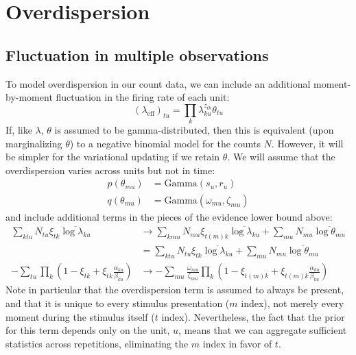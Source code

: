 \documentclass[11pt]{article}
\begin{document}
\section{Overdispersion}
\subsection{Fluctuation in multiple observations}
To model overdispersion in our count data, we can include an additional moment-by-moment fluctuation in the firing rate of each unit:
\begin{equation}
    (\lambda_{\mathrm{eff}})_{tu} = \prod_k \lambda_{ku}^{z_{tk}}\theta_{tu}
\end{equation}
If, like $\lambda$, $\theta$ is assumed to be gamma-distributed, then this is equivalent (upon marginalizing $\theta$) to a negative binomial model for the counts $N$. However, it will be simpler for the variational updating if we retain $\theta$. We will assume that the overdispersion varies across units but not in time:
\begin{align}
    p(\theta_{mu}) &= \mathrm{Gamma}(s_u, r_u) \\
    q(\theta_{mu}) &= \mathrm{Gamma}(\omega_{mu}, \zeta_{mu})
\end{align}
and include additional terms in the pieces of the evidence lower bound above:
\begin{align*}
    \sum_{ktu} N_{tu} \xi_{tk} \overline{\log \lambda_{ku}} &\rightarrow \sum_{kmu} N_{mu} \xi_{t(m)k} \overline{\log \lambda_{ku}} + \sum_{mu} N_{mu} \overline{\log \theta_{mu}} \\
    &= \sum_{ktu} N_{tu} \xi_{tk} \overline{\log \lambda_{ku}} + \sum_{mu} N_{mu} \overline{\log \theta_{mu}} \\
    - \sum_{tu} \prod_k \left( 1 - \xi_{tk} + \xi_{tk} \frac{\alpha_{ku}}{\beta_{ku}}\right) &\rightarrow - \sum_{mu} \frac{\omega_{mu}}{\zeta_{mu}} \prod_k \left( 1 - \xi_{t(m)k} + \xi_{t(m)k} \frac{\alpha_{ku}}{\beta_{ku}}\right)
\end{align*}
Note in particular that the overdispersion term is assumed to always be present, and that it is unique to every stimulus presentation ($m$ index), not merely every moment during the stimulus itself ($t$ index). Nevertheless, the fact that the prior for this term depends only on the unit, $u$, means that we can aggregate sufficient statistics across repetitions, eliminating the $m$ index in favor of $t$.
\end{document}
